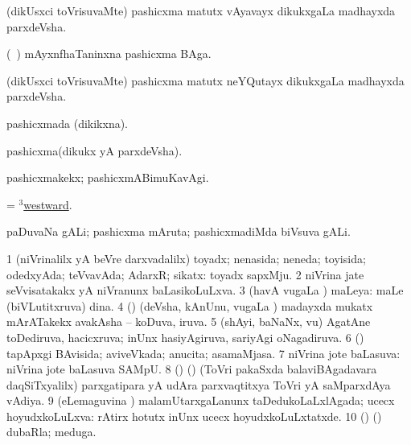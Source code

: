 \bentry
{} 
\gl{\nA}
\expl{}
\bmng
(dikUsxci toVrisuvaMte) pashicxma matutx vAyavayx dikukxgaLa madhayxda parxdeVsha. 
\emng
\eentry

\bentry
{} 
\gl{\nA}
\expl{}
\bmng
(\kanu\ \ame) mAyxnfhaTaninxna pashicxma BAga. 
\emng
\eentry

\bentry
{} 
\gl{\nA}
\expl{}
\bmng
(dikUsxci toVrisuvaMte) pashicxma matutx neYQutayx dikukxgaLa madhayxda parxdeVsha. 
\emng
\eentry

\bentry
{} 
\gl{\gu}
\expl{}
\bmng
pashicxmada (dikikxna). 
\emng
\eentry

\bentry
{} 
\gl{\nA}
\expl{}
\bmng
pashicxma(dikukx yA parxdeVsha). 
\emng
\eentry

\bentry
{} 
\gl{\kirxvi}
\expl{}
\bmng
pashicxmakekx; pashicxmABimuKavAgi. 
\emng
\eentry

\bentry
{} 
\gl{\kirxvi}
\expl{}
\bmng
= \hyperlink{westward(3)}{$^3$westward}. 
\emng
\eentry

\bentry
{} 
\gl{\nA}
\expl{}
\bmng
paDuvaNa gALi; pashicxma mAruta; pashicxmadiMda biVsuva gALi. 
\emng
\eentry

\bentry
{} 
\gl{\gu}
\bmng
\bnum
\num{1} (niVrinalilx yA beVre darxvadalilx) toyadx; nenasida; neneda; toyisida; odedxyAda; teVvavAda; AdarxR; sikatx:  toyadx sapxMju. 
\num{2} niVrina jate seVvisatakakx yA niVranunx baLasikoLuLxva. 
\num{3} (havA \mo vugaLa \vi) maLeya:  maLe (biVLutitxruva) dina. 
\num{4} (\ashi) (deVsha, kAnUnu, \mo vugaLa \vi) madayxda mukatx mArATakekx avakAsha -- koDuva, iruva. 
\num{5} (shAyi, baNaNx, \mo vu) AgatAne toDediruva, hacicxruva; inUnx hasiyAgiruva, sariyAgi oNagadiruva. 
\num{6} (\ashi) tapApxgi BAvisida; aviveVkada; anucita; asamaMjasa. 
\num{7} niVrina jote baLasuva:  niVrina jote baLasuva SAMpU. 
\num{8} (\birx) (\rAshA) (ToVri pakaSxda balaviBAgadavara daqSiTxyalilx) parxgatipara yA udAra parxvaqtitxya ToVri yA saMparxdAya vAdiya. 
\num{9} (eLemaguvina \vi) malamUtarxgaLanunx taDedukoLaLxlAgada; ucecx hoyudxkoLuLxva:  rAtirx hotutx inUnx ucecx hoyudxkoLuLxtatxde. 
\num{10} (\birx) (\AmA) dubaRla; meduga. 
\enum
\emng

